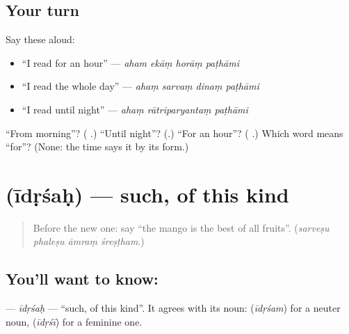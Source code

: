 \subsection*{Your turn}
Say these aloud:

\begin{itemize}
\raggedright
  \item \textquotedblleft{}I read for an hour\textquotedblright{} — \emph{aham ekāṃ horāṃ paṭhāmi}
  \item \textquotedblleft{}I read the whole day\textquotedblright{} — \emph{ahaṃ sarvaṃ dinaṃ paṭhāmi}
  \item \textquotedblleft{}I read until night\textquotedblright{} — \emph{ahaṃ rātriparyantaṃ paṭhāmi}
\end{itemize}

\begin{tcolorbox}[breakable,colback=teal!4,colframe=teal!35!black,title={Before you move on}]
\textquotedblleft{}From morning\textquotedblright{}? (\textbf{ }.) \textquotedblleft{}Until night\textquotedblright{}? (\textbf{}.) \textquotedblleft{}For an hour\textquotedblright{}? (\textbf{ }.) Which word means \textquotedblleft{}for\textquotedblright{}? (None: the time says it by its form.)
\end{tcolorbox}
\section[\texorpdfstring{\sk{ईदृशः} (īdṛśaḥ)}{ईदृशः (īdṛśaḥ)}]{ (īdṛśaḥ) — such, of this kind}

\label{lesson:SA-C283-idrsah}



\begin{quote}
Before the new one: say \textquotedblleft{}the mango is the best of all fruits\textquotedblright{}. (\emph{sarveṣu phaleṣu āmraṃ śreṣṭham}.)
\end{quote}

\subsection*{You'll want to know: }
\textbf{} — \emph{īdṛśaḥ} — \textquotedblleft{}such, of this kind\textquotedblright{}. It agrees with its noun: \textbf{} (\emph{īdṛśam}) for a neuter noun, \textbf{} (\emph{īdṛśī}) for a feminine one.

\begin{quote}
\textbf{   }
\end{quote}

